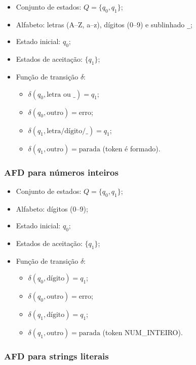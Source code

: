 \documentclass[12pt,a4paper]{article}
\begin{document}
\begin{itemize}
  \item Conjunto de estados: $Q = \{ q_0, q_1 \}$;
  \item Alfabeto: letras (A--Z, a--z), dígitos (0--9) e sublinhado \texttt{\_};
  \item Estado inicial: $q_0$;
  \item Estados de aceitação: $\{ q_1 \}$;
  \item Função de transição $\delta$:
  \begin{itemize}
    \item $\delta(q_0,\text{letra ou \_}) = q_1$;
    \item $\delta(q_0,\text{outro}) = \text{erro}$;
    \item $\delta(q_1,\text{letra/dígito/\_}) = q_1$;
    \item $\delta(q_1,\text{outro}) = \text{parada}$ (token é formado).
  \end{itemize}
\end{itemize}

\subsubsection*{AFD para números inteiros}

\begin{itemize}
  \item Conjunto de estados: $Q = \{ q_0, q_1 \}$;
  \item Alfabeto: dígitos (0--9);
  \item Estado inicial: $q_0$;
  \item Estados de aceitação: $\{ q_1 \}$;
  \item Função de transição $\delta$:
  \begin{itemize}
    \item $\delta(q_0,\text{dígito}) = q_1$;
    \item $\delta(q_0,\text{outro}) = \text{erro}$;
    \item $\delta(q_1,\text{dígito}) = q_1$;
    \item $\delta(q_1,\text{outro}) = \text{parada}$ (token NUM\_INTEIRO).
  \end{itemize}
\end{itemize}

\subsubsection*{AFD para strings literais}
\end{document}
